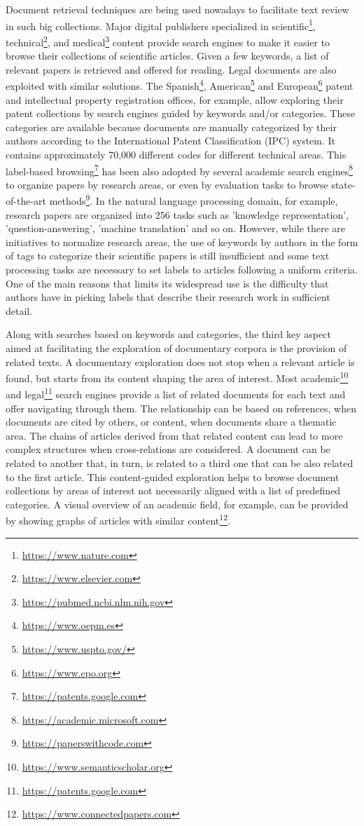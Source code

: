Document retrieval techniques are being used nowadays to facilitate text review in such big collections. Major digital publishers specialized in scientific\footnote{\url{https://www.nature.com}}, technical\footnote{\url{https://www.elsevier.com}}, and medical\footnote{\url{https://pubmed.ncbi.nlm.nih.gov}} content provide search engines to make it easier to browse their collections of scientific articles. Given a few keywords, a list of relevant papers is retrieved and offered for reading. Legal documents are also exploited with similar solutions. The Spanish\footnote{\url{https://www.oepm.es}}, American\footnote{\url{https://www.uspto.gov/}} and European\footnote{\url{https://www.epo.org}} patent and intellectual property registration offices, for example, allow exploring their patent collections by search engines guided by keywords and/or categories. These categories are available because documents are manually categorized by their authors according to the International Patent Classification (IPC) system. It contains approximately 70,000 different codes for different technical areas. This label-based browsing\footnote{\url{https://patents.google.com}} has been also adopted by several academic search engines\footnote{\url{https://academic.microsoft.com}} to organize papers by research areas, or even by evaluation tasks to browse state-of-the-art methods\footnote{\url{https://paperswithcode.com}}. In the natural language processing domain, for example, research papers are organized into 256 tasks such as 'knowledge representation', 'question-answering', 'machine translation' and so on. However, while there are initiatives to normalize research areas, the use of keywords by authors in the form of tags to categorize their scientific papers is still insufficient and some text processing tasks are necessary to set labels to articles following a uniform criteria. One of the main reasons that limits its widespread use is the difficulty that authors have in picking labels that describe their research work in sufficient detail.

Along with searches based on keywords and categories, the third key aspect aimed at facilitating the exploration of documentary corpora is the provision of related texts. A documentary exploration does not stop when a relevant article is found, but starts from its content shaping the area of interest. Most academic\footnote{\url{https://www.semanticscholar.org}} and legal\footnote{\url{https://patents.google.com}} search engines provide a list of related documents for each text and offer navigating through them. The relationship can be based on references, when documents are cited by others, or content, when documents share a thematic area. The chains of articles derived from that related content can lead to more complex structures when cross-relations are considered. A document can be related to another that, in turn, is related to a third one that can be also related to the first article. This content-guided exploration helps to browse document collections by areas of interest not necessarily aligned with a list of predefined categories. A visual overview of an academic field, for example, can be provided by showing graphs of articles with similar content\footnote{\url{https://www.connectedpapers.com}}.


